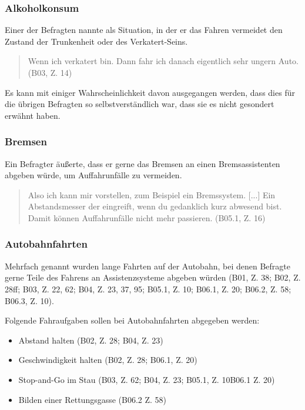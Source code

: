 \documentclass[12pt]{article}
\begin{document}
\subsubsection*{Alkoholkonsum}
Einer der Befragten nannte als Situation, in der er das Fahren vermeidet den Zustand der Trunkenheit oder des Verkatert-Seins.

\begin{quote}
  Wenn ich verkatert bin. Dann fahr ich danach eigentlich sehr ungern Auto. (B03, Z. 14)
\end{quote}

Es kann mit einiger Wahrscheinlichkeit davon ausgegangen werden, dass dies für die übrigen Befragten so selbstverständlich war, dass sie es nicht gesondert erwähnt haben.

\subsubsection*{Bremsen}
Ein Befragter äußerte, dass er gerne das Bremsen an einen Bremsassistenten abgeben würde, um Auffahrunfälle zu vermeiden.

\begin{quote}
  Also ich kann mir vorstellen, zum Beispiel ein Bremssystem. [...] Ein Abstandsmesser der eingreift, wenn du gedanklich kurz abwesend bist. Damit können Auffahrunfälle nicht mehr passieren. (B05.1, Z. 16)
\end{quote}

\subsubsection*{Autobahnfahrten}
Mehrfach genannt wurden lange Fahrten auf der Autobahn, bei denen Befragte gerne Teile des Fahrens an Assistenzsysteme abgeben würden (B01, Z. 38; B02, Z. 28ff; B03, Z. 22, 62; B04, Z. 23, 37, 95; B05.1, Z. 10; B06.1, Z. 20; B06.2, Z. 58; B06.3, Z. 10).

Folgende Fahraufgaben sollen bei Autobahnfahrten abgegeben werden:
\begin{itemize}
  \item Abstand halten (B02, Z. 28; B04, Z. 23)
  \item Geschwindigkeit halten (B02, Z. 28; B06.1, Z. 20)
  \item Stop-and-Go im Stau (B03, Z. 62; B04, Z. 23; B05.1, Z. 10B06.1 Z. 20)
  \item Bilden einer Rettungsgasse (B06.2 Z. 58)
\end{itemize}
\end{document}
